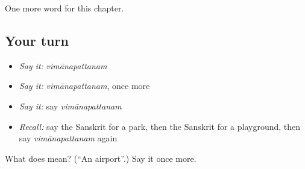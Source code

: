 \begin{grammarlens}[title={What you've built}]
One more word for this chapter.
\end{grammarlens}

\subsection*{Your turn}
\begin{itemize}
\raggedright
  \item \emph{Say it:} \emph{vimānapattanam}
  \item \emph{Say it:} \emph{vimānapattanam}, once more
  \item \emph{Say it:} say \emph{vimānapattanam}
  \item \emph{Recall:} say the Sanskrit for a park, then the Sanskrit for a playground, then say \emph{vimānapattanam} again
\end{itemize}

\begin{tcolorbox}[breakable,colback=teal!4,colframe=teal!35!black,title={Before you move on}]
What does  mean? (\textquotedblleft{}An airport\textquotedblright{}.) Say it once more.
\end{tcolorbox}
